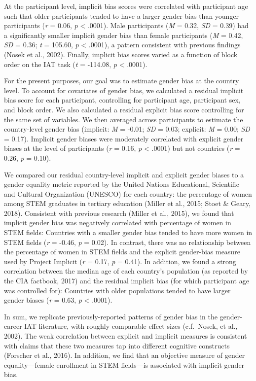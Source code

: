 \documentclass[man,floatsintext]{apa6}
\theoremstyle{definition}
\theoremstyle{definition}
\theoremstyle{definition}
\theoremstyle{remark}
\begin{document}
At the participant level, implicit bias scores were correlated with
participant age such that older participants tended to have a larger
gender bias than younger participants (\emph{r} = 0.06, \emph{p}
\textless{} .0001). Male participants (\emph{M} = 0.32, \emph{SD} =
0.39) had a significantly smaller implicit gender bias than female
participants (\emph{M} = 0.42, \emph{SD} = 0.36; \emph{t} = 105.60,
\emph{p} \textless{} .0001), a pattern consistent with previous findings
(Nosek et al., 2002). Finally, implicit bias scores varied as a function
of block order on the IAT task (\emph{t} = -114.08, \emph{p} \textless{}
.0001).

For the present purposes, our goal was to estimate gender bias at the
country level. To account for covariates of gender bias, we calculated a
residual implicit bias score for each participant, controlling for
participant age, participant sex, and block order. We also calculated a
residual explicit bias score controlling for the same set of variables.
We then averaged across participants to estimate the country-level
gender bias (implicit: \emph{M} = -0.01; \emph{SD} = 0.03; explicit:
\emph{M} = 0.00; \emph{SD} = 0.17). Implicit gender biases were
moderately correlated with explicit gender biases at the level of
participants (\emph{r} = 0.16, \emph{p} \textless{} .0001) but not
countries (\emph{r} = 0.26, \emph{p} = 0.10).

We compared our residual country-level implicit and explicit gender
biases to a gender equality metric reported by the United Nations
Educational, Scientific and Cultural Organization (UNESCO) for each
country: the percentage of women among STEM graduates in tertiary
education (Miller et al., 2015; Stoet \& Geary, 2018). Consistent with
previous research (Miller et al., 2015), we found that implicit gender
bias was negatively correlated with percentage of women in STEM fields:
Countries with a smaller gender bias tended to have more women in STEM
fields (\emph{r} = -0.46, \emph{p} = 0.02). In contrast, there was no
relationship between the percentage of women in STEM fields and the
explicit gender-bias measure used by Project Implicit (\emph{r} = 0.17,
\emph{p} = 0.41). In addition, we found a strong correlation between the
median age of each country's population (as reported by the CIA
factbook, 2017) and the residual implicit bias (for which participant
age was controlled for): Countries with older populations tended to have
larger gender biases (\emph{r} = 0.63, \emph{p} \textless{} .0001).

In sum, we replicate previously-reported patterns of gender bias in the
gender-career IAT literature, with roughly comparable effect sizes
(c.f.~Nosek, et al., 2002). The weak correlation between explicit and
implicit measures is consistent with claims that these two measures tap
into different cognitive constructs (Forscher et al., 2016). In
addition, we find that an objective measure of gender equality---female
enrollment in STEM fields---is associated with implicit gender bias.
\end{document}
